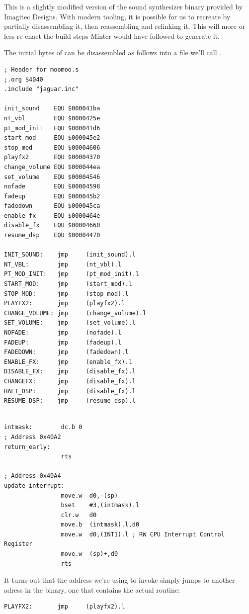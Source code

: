 This is a slightly modified version of the  sound synthesizer binary provided by Imagitec Designs. With modern
tooling, it is possible for us to recreate  by partially disassembling it, then reassembling and relinking it.
This will more or less re-enact the build steps Minter would have followed to generate it.

The initial bytes of  can be disassembled as follows into a file we'll call . 
\begin{lstlisting}
; Header for moomoo.s
;.org $4040
.include "jaguar.inc"

init_sound    EQU $000041ba
nt_vbl        EQU $0000425e
pt_mod_init   EQU $000041d6
start_mod     EQU $000045e2
stop_mod      EQU $00004606
playfx2       EQU $00004370
change_volume EQU $000044ea
set_volume    EQU $00004546
nofade        EQU $00004598
fadeup        EQU $000045b2
fadedown      EQU $000045ca
enable_fx     EQU $0000464e
disable_fx    EQU $00004660
resume_dsp    EQU $00004470

INIT_SOUND:    jmp     (init_sound).l
NT_VBL:        jmp     (nt_vbl).l
PT_MOD_INIT:   jmp     (pt_mod_init).l
START_MOD:     jmp     (start_mod).l
STOP_MOD:      jmp     (stop_mod).l
PLAYFX2:       jmp     (playfx2).l
CHANGE_VOLUME: jmp     (change_volume).l
SET_VOLUME:    jmp     (set_volume).l
NOFADE:        jmp     (nofade).l
FADEUP:        jmp     (fadeup).l
FADEDOWN:      jmp     (fadedown).l
ENABLE_FX:     jmp     (enable_fx).l
DISABLE_FX:    jmp     (disable_fx).l
CHANGEFX:      jmp     (disable_fx).l
HALT_DSP:      jmp     (disable_fx).l
RESUME_DSP:    jmp     (resume_dsp).l
\end{lstlisting}
\begin{lstlisting}

intmask:        dc.b 0
; Address 0x40A2
return_early:
                rts

; Address 0x40A4
update_interrupt:
                move.w  d0,-(sp)
                bset    #3,(intmask).l
                clr.w   d0
                move.b  (intmask).l,d0
                move.w  d0,(INT1).l ; RW CPU Interrupt Control Register
                move.w  (sp)+,d0
                rts
\end{lstlisting}

It turns out that the address we're using to invoke  simply jumps to another adress in the binary,
one that contains the actual  routine:

\begin{lstlisting}
PLAYFX2:       jmp     (playfx2).l
\end{lstlisting}

